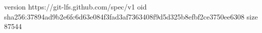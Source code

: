 version https://git-lfs.github.com/spec/v1
oid sha256:37894ad9b2e6fc6d63e084f3fad3af7363408f9d5d325b8efbf2ce3750ee6308
size 87544
